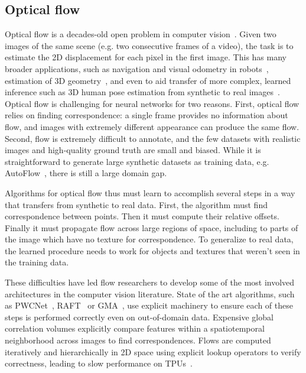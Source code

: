 \documentclass{article} \usepackage{iclr2022_conference,times}
\begin{document}
\subsection{Optical flow}
\label{sec:flow}

Optical flow is a decades-old open problem in computer vision~\citep{lucas1981iterative,horn1981determining}. Given two images of the same scene (e.g. two consecutive frames of a video), the task is to estimate the 2D displacement for each pixel in the first image.  This has many broader applications, such as navigation and visual odometry in robots~\citep{campbell2004techniques}, estimation of 3D geometry~\citep{ranftl2020towards}, and even to aid transfer of more complex, learned inference such as 3D human pose estimation from synthetic to real images~\citep{doersch2019sim2real}.
Optical flow is challenging for neural networks for two reasons.  First, optical flow relies on finding correspondence: a single frame provides no information about flow, and images with extremely different appearance can produce the same flow.  Second, flow is extremely difficult to annotate, and the few datasets with realistic images and high-quality ground truth are small and biased.  While it is straightforward to generate large synthetic datasets as training data, e.g. AutoFlow~\citep{sun2021autoflow}, there is still a large domain gap.

Algorithms for optical flow thus must learn to accomplish several steps in a way that transfers from synthetic to real data. First, the algorithm must find correspondence between points. Then it must compute their relative offsets. Finally it must propagate flow across large regions of space, including to parts of the image which have no texture for correspondence. To generalize to real data, the learned procedure needs to work for objects and textures that weren't seen in the training data.

These difficulties have led flow researchers to develop some of the most involved architectures in the computer vision literature. State of the art algorithms, such as PWCNet~\citep{sun2018pwc}, RAFT~\citep{teed2020raft} or GMA~\citep{jiang2021learning}, use explicit machinery to ensure each of these steps is performed correctly even on out-of-domain data.  Expensive global correlation volumes explicitly compare features within a spatiotemporal neighborhood across images to find correspondences. Flows are computed iteratively and hierarchically in 2D space using explicit lookup operators to verify correctness, leading to slow performance on TPUs~\citep{jouppi2017datacenter}.
\end{document}
